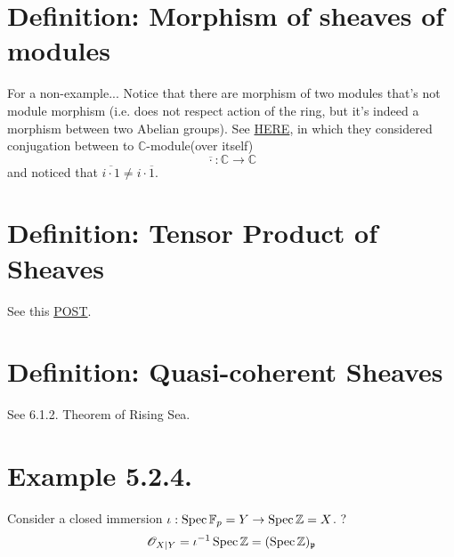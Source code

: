 \section{Definition: Morphism of sheaves of modules}

For a non-example... Notice that there are morphism of two modules that's not module morphism (i.e. does not respect action of the ring, but it's indeed a morphism between two Abelian groups). See \href{https://math.stackexchange.com/questions/1856824/is-a-group-homomorphism-a-module-homomorphism}{HERE}, in which they considered conjugation between to $\mathbb C$-module(over itself)
\[\overline{\cdot}:\mathbb C\to\mathbb C\]
and noticed that $\overline{i\cdot 1}\neq i\cdot \overline{1}$.

\section{Definition: Tensor Product of Sheaves}

See this \href{https://math.stackexchange.com/questions/1488296/tensor-product-of-sheaves-is-not-a-sheaf}{POST}.

\begin{comment}
\subsection{A Counterexample by ChatGPT}

Let \( X = \mathbb{R} \) be the real line, and consider the following covering:
\[ U_1 = (-\infty, 1) \quad \text{and} \quad U_2 = (-1, \infty) \]

We define two sheaves:
\begin{itemize}
    \item $\mathcal{F}$ is the sheaf of continuous real-valued functions on $X$.
    \item $\mathcal{G}$ is the sheaf of bounded real-valued functions on $X$.
\end{itemize}
Now, let's define the presheaf $\mathcal{H}$ on $X$ as the tensor product presheaf $\mathcal{F} \otimes \mathcal{G}$, where:


Consider the continuous, bounded functions \( f_1(x) = e^x \) defined on \( U_1 \) and \( f_2(x) = e^{-x} \) defined on \( U_2 \). These functions agree on the intersection \( U_1 \cap U_2 = \emptyset \).

However, if we attempt to glue these functions together to form a candidate section \( s \) over \( X \), we encounter a problem. Since \( f_1(x) \) and \( f_2(x) \) have different behaviors on the intervals \( U_1 \) and \( U_2 \), respectively, there is no continuous, bounded function that can extend both \( f_1(x) \) and \( f_2(x) \) over the entire real line \( X \).
\end{comment}


\section{Definition: Quasi-coherent Sheaves}

See 6.1.2. Theorem of Rising Sea. 

\section{Example 5.2.4.}

Consider a closed immersion $\iota:\operatorname{Spec} \mathbb F_{p}=Y\to \operatorname{Spec} \mathbb Z=X$. ?
\[\mathscr O_{X\vert Y}=\iota^{-1}\operatorname{Spec} \mathbb Z=(\operatorname{Spec} \mathbb Z)_{\mathfrak p}\]